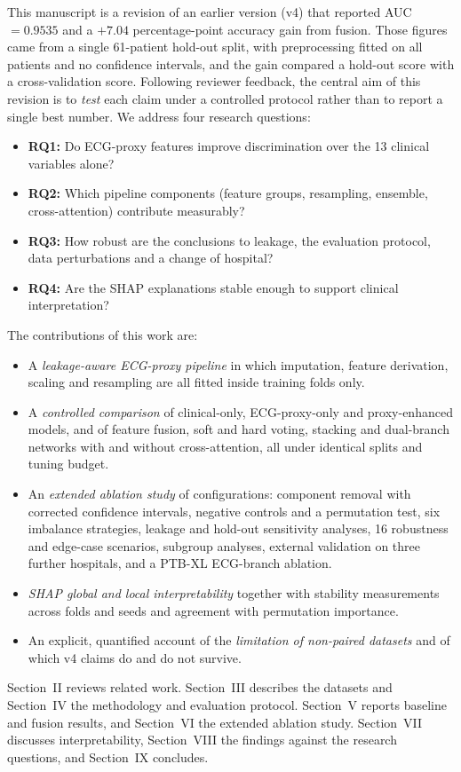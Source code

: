 This manuscript is a revision of an earlier version (v4) that reported AUC $=0.9535$ and a $+7.04$ percentage-point accuracy gain from fusion. Those figures came from a single 61-patient hold-out split, with preprocessing fitted on all patients and no confidence intervals, and the gain compared a hold-out score with a cross-validation score. Following reviewer feedback, the central aim of this revision is to \emph{test} each claim under a controlled protocol rather than to report a single best number. We address four research questions:
\begin{itemize}
\item \textbf{RQ1:} Do ECG-proxy features improve discrimination over the 13 clinical variables alone?
\item \textbf{RQ2:} Which pipeline components (feature groups, resampling, ensemble, cross-attention) contribute measurably?
\item \textbf{RQ3:} How robust are the conclusions to leakage, the evaluation protocol, data perturbations and a change of hospital?
\item \textbf{RQ4:} Are the SHAP explanations stable enough to support clinical interpretation?
\end{itemize}

The contributions of this work are:
\begin{itemize}
\item A \emph{leakage-aware ECG-proxy pipeline} in which imputation, feature derivation, scaling and resampling are all fitted inside training folds only.
\item A \emph{controlled comparison} of clinical-only, ECG-proxy-only and proxy-enhanced models, and of feature fusion, soft and hard voting, stacking and dual-branch networks with and without cross-attention, all under identical splits and tuning budget.
\item An \emph{extended ablation study} of \nVariants{} configurations: component removal with corrected confidence intervals, negative controls and a permutation test, six imbalance strategies, leakage and hold-out sensitivity analyses, 16 robustness and edge-case scenarios, subgroup analyses, external validation on three further hospitals, and a PTB-XL ECG-branch ablation.
\item \emph{SHAP global and local interpretability} together with stability measurements across folds and seeds and agreement with permutation importance.
\item An explicit, quantified account of the \emph{limitation of non-paired datasets} and of which v4 claims do and do not survive.
\end{itemize}

Section~II reviews related work. Section~III describes the datasets and Section~IV the methodology and evaluation protocol. Section~V reports baseline and fusion results, and Section~VI the extended ablation study. Section~VII discusses interpretability, Section~VIII the findings against the research questions, and Section~IX concludes.
